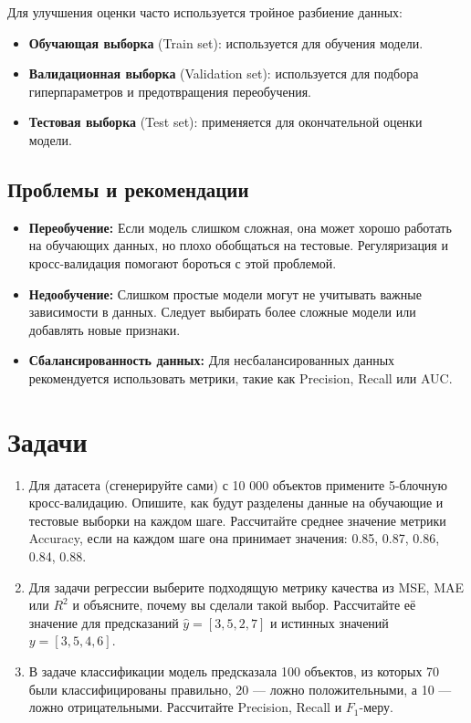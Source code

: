 Для улучшения оценки часто используется тройное разбиение данных:
\begin{itemize}
    \item \textbf{Обучающая выборка} (Train set): используется для обучения модели.
    \item \textbf{Валидационная выборка} (Validation set): используется для подбора гиперпараметров и предотвращения переобучения.
    \item \textbf{Тестовая выборка} (Test set): применяется для окончательной оценки модели.
\end{itemize}

\subsection*{Проблемы и рекомендации}
\begin{itemize}
    \item \textbf{Переобучение:} Если модель слишком сложная, она может хорошо работать на обучающих данных, но плохо обобщаться на тестовые. Регуляризация и кросс-валидация помогают бороться с этой проблемой.
    \item \textbf{Недообучение:} Слишком простые модели могут не учитывать важные зависимости в данных. Следует выбирать более сложные модели или добавлять новые признаки.
    \item \textbf{Сбалансированность данных:} Для несбалансированных данных рекомендуется использовать метрики, такие как Precision, Recall или AUC.
\end{itemize}

\section*{Задачи}

\begin{enumerate}
    \item Для датасета (сгенерируйте сами) с 10 000 объектов примените 5-блочную кросс-валидацию. Опишите, как будут разделены данные на обучающие и тестовые выборки на каждом шаге. Рассчитайте среднее значение метрики Accuracy, если на каждом шаге она принимает значения: 0.85, 0.87, 0.86, 0.84, 0.88.

    \item Для задачи регрессии выберите подходящую метрику качества из MSE, MAE или $R^2$ и объясните, почему вы сделали такой выбор. Рассчитайте её значение для предсказаний $\hat{y} = [3, 5, 2, 7]$ и истинных значений $y = [3, 5, 4, 6]$.

    \item В задаче классификации модель предсказала 100 объектов, из которых 70 были классифицированы правильно, 20 --- ложно положительными, а 10 --- ложно отрицательными. Рассчитайте Precision, Recall и $F_1$-меру.
\end{enumerate}


